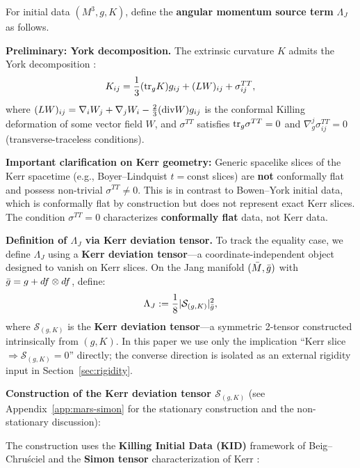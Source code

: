 \begin{definition}\label{def:Lambda-J}
For initial data $(M^3, g, K)$, define the \textbf{angular momentum source term} $\Lambda_J$ as follows. 

\textbf{Preliminary: York decomposition.} The extrinsic curvature $K$ admits the York decomposition \cite{york1973}:
\[
K_{ij} = \frac{1}{3}(\mathrm{tr}_g K)g_{ij} + (LW)_{ij} + \sigma^{TT}_{ij},
\]
where $(LW)_{ij} = \nabla_i W_j + \nabla_j W_i - \frac{2}{3}(\mathrm{div} W)g_{ij}$ is the conformal Killing deformation of some vector field $W$, and $\sigma^{TT}$ satisfies $\mathrm{tr}_g \sigma^{TT} = 0$ and $\nabla^j_g \sigma^{TT}_{ij} = 0$ (transverse-traceless conditions).

\textbf{Important clarification on Kerr geometry:} Generic spacelike slices of the Kerr spacetime (e.g., Boyer--Lindquist $t = \mathrm{const}$ slices) are \textbf{not} conformally flat and possess non-trivial $\sigma^{TT} \neq 0$. This is in contrast to Bowen--York initial data, which is conformally flat by construction but does not represent exact Kerr slices. The condition $\sigma^{TT} = 0$ characterizes \textbf{conformally flat} data, not Kerr data.

\textbf{Definition of $\Lambda_J$ via Kerr deviation tensor.} To track the equality case, we define $\Lambda_J$ using a \textbf{Kerr deviation tensor}---a coordinate-independent object designed to vanish on Kerr slices. On the Jang manifold $(\bar{M}, \bar{g})$ with $\bar{g} = g + df \otimes df$, define:
\begin{equation}\label{eq:Lambda-J-def}
\Lambda_J := \frac{1}{8}|\mathcal{S}_{(g,K)}|^2_{\bar{g}},
\end{equation}
where $\mathcal{S}_{(g,K)}$ is the \textbf{Kerr deviation tensor}---a symmetric 2-tensor constructed intrinsically from $(g, K)$. In this paper we use only the implication ``Kerr slice $\Rightarrow \mathcal{S}_{(g,K)}=0$'' directly; the converse direction is isolated as an external rigidity input in Section~\ref{sec:rigidity}.

\textbf{Construction of the Kerr deviation tensor $\mathcal{S}_{(g,K)}$} (see Appendix~\ref{app:mars-simon} for the stationary construction and the non-stationary discussion):

The construction uses the \textbf{Killing Initial Data (KID)} framework of Beig--Chru\'sciel \cite{beigchrusciel1996} and the \textbf{Simon tensor} characterization of Kerr \cite{simon1984, backdahl2010a, backdahl2010b}:


\end{definition}
